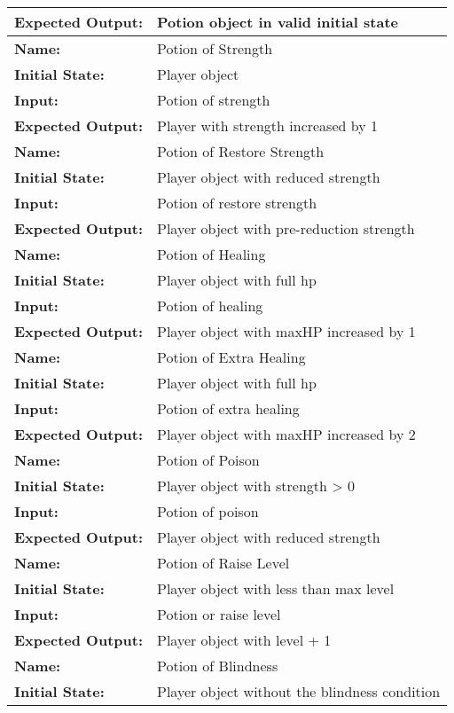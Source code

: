 \documentclass[12pt, titlepage]{article}
\begin{document}
\begin{center}
\begin{longtable}{ l | p{10cm} }
				\textbf{Expected Output:} & Potion object in valid initial state\\
				\hline
				\textbf{Name:} & Potion of Strength\\
				\textbf{Initial State:} & Player object\\
				\textbf{Input:} & Potion of strength\\
				\textbf{Expected Output:} & Player with strength increased by 1\\
				\hline
				\textbf{Name:} & Potion of Restore Strength\\
				\textbf{Initial State:} & Player object with reduced strength\\
				\textbf{Input:} & Potion of restore strength\\
				\textbf{Expected Output:} & Player object with pre-reduction strength\\
				\hline
				\textbf{Name:} & Potion of Healing\\
				\textbf{Initial State:} & Player object with full hp\\
				\textbf{Input:} & Potion of healing\\
				\textbf{Expected Output:} & Player object with maxHP increased by 1\\
				\hline
				\textbf{Name:} & Potion of Extra Healing\\
				\textbf{Initial State:} & Player object with full hp\\
				\textbf{Input:} & Potion of extra healing\\
				\textbf{Expected Output:} & Player object with maxHP increased by 2\\
				\hline
				\textbf{Name:} & Potion of Poison\\
				\textbf{Initial State:} & Player object with strength > 0\\
				\textbf{Input:} & Potion of poison\\
				\textbf{Expected Output:} & Player object with reduced strength\\
				\hline
				\textbf{Name:} & Potion of Raise Level\\
				\textbf{Initial State:} & Player object with less than max level\\
				\textbf{Input:} & Potion or raise level\\
				\textbf{Expected Output:} & Player object with level + 1\\
				\hline
				\textbf{Name:} & Potion of Blindness\\
				\textbf{Initial State:} & Player object without the blindness condition\\

\end{longtable}
\end{center}
\end{document}
